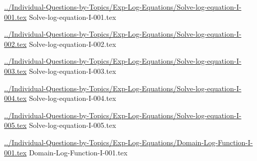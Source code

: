 \documentclass[answer,cancelspace,12pt]{exam}
\begin{document}
\begin{questions}
\question
\href{../Individual-Questions-by-Topics/Exp-Log-Equations/Solve-log-equation-I-001.tex}{../Individual-Questions-by-Topics/Exp-Log-Equations/Solve-log-equation-I-001.tex}
{Solve-log-equation-I-001.tex}

\question
\href{../Individual-Questions-by-Topics/Exp-Log-Equations/Solve-log-equation-I-002.tex}{../Individual-Questions-by-Topics/Exp-Log-Equations/Solve-log-equation-I-002.tex}
{Solve-log-equation-I-002.tex}


\question
\href{../Individual-Questions-by-Topics/Exp-Log-Equations/Solve-log-equation-I-003.tex}{../Individual-Questions-by-Topics/Exp-Log-Equations/Solve-log-equation-I-003.tex}
{Solve-log-equation-I-003.tex}


\question
\href{../Individual-Questions-by-Topics/Exp-Log-Equations/Solve-log-equation-I-004.tex}{../Individual-Questions-by-Topics/Exp-Log-Equations/Solve-log-equation-I-004.tex}
{Solve-log-equation-I-004.tex}

\question
\href{../Individual-Questions-by-Topics/Exp-Log-Equations/Solve-log-equation-I-005.tex}{../Individual-Questions-by-Topics/Exp-Log-Equations/Solve-log-equation-I-005.tex}
{Solve-log-equation-I-005.tex}

\question
\href{../Individual-Questions-by-Topics/Exp-Log-Equations/Domain-Log-Function-I-001.tex}{../Individual-Questions-by-Topics/Exp-Log-Equations/Domain-Log-Function-I-001.tex}
{Domain-Log-Function-I-001.tex}


\vspace*{\fill}















\vfill
\mbox{}
\end{questions}
\end{document}
